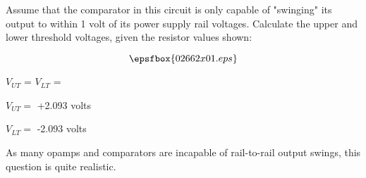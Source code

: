 

Assume that the comparator in this circuit is only capable of "swinging" its output to within 1 volt of its power supply rail voltages.  Calculate the upper and lower threshold voltages, given the resistor values shown:

$$\epsfbox{02662x01.eps}$$

$V_{UT}$ = \hskip 80pt $V_{LT}$ = 

\vskip 10pt







$V_{UT} =$ +2.093 volts

\vskip 10pt

$V_{LT} =$ -2.093 volts







As many opamps and comparators are incapable of rail-to-rail output swings, this question is quite realistic.




